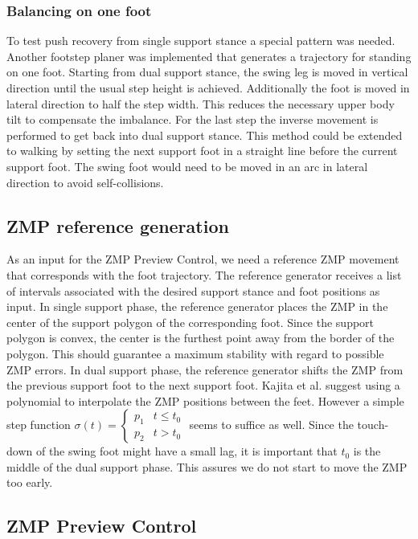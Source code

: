 \documentclass[english,ngerman]{KITreprt}
\begin{document}
\subsubsection{Balancing on one foot}\label{balancing-on-one-foot}

To test push recovery from single support stance a special pattern was
needed. Another footstep planer was implemented that generates a
trajectory for standing on one foot. Starting from dual support stance,
the swing leg is moved in vertical direction until the usual step height
is achieved. Additionally the foot is moved in lateral direction to half
the step width. This reduces the necessary upper body tilt to compensate
the imbalance. For the last step the inverse movement is performed to
get back into dual support stance. This method could be extended to
walking by setting the next support foot in a straight line before the
current support foot. The swing foot would need to be moved in an arc in
lateral direction to avoid self-collisions.

\subsection{ZMP reference generation}\label{zmp-reference-generation}

As an input for the ZMP Preview Control, we need a reference ZMP
movement that corresponds with the foot trajectory. The reference
generator receives a list of intervals associated with the desired
support stance and foot positions as input. In single support phase, the
reference generator places the ZMP in the center of the support polygon
of the corresponding foot. Since the support polygon is convex, the
center is the furthest point away from the border of the polygon. This
should guarantee a maximum stability with regard to possible ZMP errors.
In dual support phase, the reference generator shifts the ZMP from the
previous support foot to the next support foot. Kajita et al. suggest
using a polynomial to interpolate the ZMP positions between the feet.
However a simple step function
$\sigma(t) = \left\{\begin{array}{lr}p_1 & t \leq t_0 \\ p_2 & t > t_0 \end{array}\right.$
seems to suffice as well. Since the touch-down of the swing foot might
have a small lag, it is important that $t_0$ is the middle of the dual
support phase. This assures we do not start to move the ZMP too early.

\subsection{ZMP Preview Control}\label{zmp-preview-control}
\end{document}
